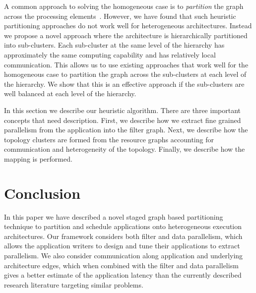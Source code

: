 \documentclass[10pt, conference, compsocconf]{IEEEtran}
\begin{document}
A
common approach to solving the homogeneous case is to \textit{partition}
the graph across the processing elements~\cite{aale01,kpur99,enys98}.
However, we have found that such heuristic partitioning approaches do
not work well for heterogeneous architectures. Instead we propose a
novel approach where the architecture is hierarchically partitioned into
sub-clusters.  Each sub-cluster at the same level of the hierarchy has
approximately the same computing capability and has relatively local
communication.  This allows us to use existing approaches that work well
for the homogeneous case to partition the graph across the sub-clusters
at each level of the hierarchy. We show that this is an effective
approach if the sub-clusters are well balanced at each level of the
hierarchy.


In this section we describe our heuristic algorithm. There are three
important concepts that need description. First, we describe how we
extract fine grained parallelism from the application into the filter
graph. Next, we describe how the topology clusters are formed from the
resource graphs accounting for communication and heterogeneity of the
topology. Finally, we describe how the mapping is performed.

%



% 





\section{Conclusion}
\label{sec:conclusion}

In this paper we have described a novel staged graph based partitioning
technique to partition and schedule applications onto heterogeneous
execution architectures. %
Our framework considers both filter and data parallelism, which allows the
application writers to design and tune their applications to extract
parallelism. We also consider communication along application and
underlying architecture edges, which when combined with the filter and
data parallelism gives a better estimate of the application latency than
the currently described research literature targeting similar problems.
\end{document}
